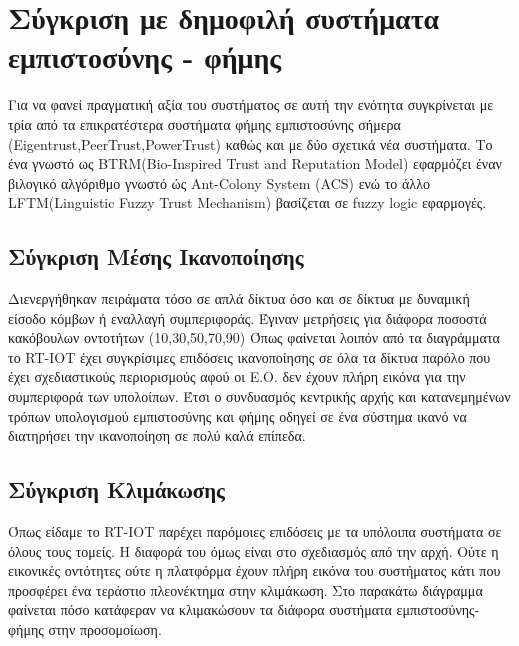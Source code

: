 \section{Σύγκριση με δημοφιλή συστήματα εμπιστοσύνης - φήμης}
Για να φανεί  πραγματική αξία του συστήματος σε αυτή την ενότητα
συγκρίνεται με τρία από τα επικρατέστερα συστήματα φήμης εμπιστοσύνης σήμερα (Eigentrust,PeerTrust,PowerTrust) %
 καθώς και με δύο σχετικά νέα συστήματα. Το ένα γνωστό ως BTRM(Bio-Inspired Trust and Reputation Model)  εφαρμόζει έναν βιλογικό αλγόριθμο γνωστό ώς Ant-Colony System (ACS) %
ενώ το άλλο LFTM(Linguistic Fuzzy Trust Mechanism) βασίζεται σε fuzzy logic εφαρμογές.



\subsection{Σύγκριση Μέσης Ικανοποίησης}

Διενεργήθηκαν πειράματα τόσο σε απλά δίκτυα όσο και σε δίκτυα με δυναμική είσοδο κόμβων ή εναλλαγή συμπεριφοράς. Έγιναν μετρήσεις για διάφορα ποσοστά κακόβουλων οντοτήτων (10,30,50,70,90)
Όπως φαίνεται λοιπόν από τα διαγράμματα το RT-IOT έχει συγκρίσιμες επιδόσεις ικανοποίησης σε όλα τα δίκτυα παρόλο που έχει σχεδιαστικούς περιορισμούς αφού οι Ε.Ο. δεν έχουν πλήρη εικόνα για την συμπεριφορά των υπολοίπων. Έτσι ο συνδυασμός κεντρικής αρχής και κατανεμημένων τρόπων υπολογισμού εμπιστοσύνης και φήμης οδηγεί σε ένα σύστημα ικανό να διατηρήσει την ικανοποίηση σε πολύ καλά επίπεδα.

\newpage
\subsection{Σύγκριση Κλιμάκωσης}

Όπως είδαμε το RT-IOT παρέχει παρόμοιες επιδόσεις με τα υπόλοιπα συστήματα σε όλους τους τομείς. Η διαφορά του όμως είναι στο σχεδιασμός από την αρχή. Ούτε η εικονικές οντότητες ούτε η πλατφόρμα έχουν πλήρη εικόνα του συστήματος κάτι που προσφέρει ένα τεράστιο πλεονέκτημα στην κλιμάκωση. Στο παρακάτω διάγραμμα φαίνεται πόσο κατάφεραν να κλιμακώσουν τα διάφορα συστήματα εμπιστοσύνης-φήμης στην προσομοίωση.

